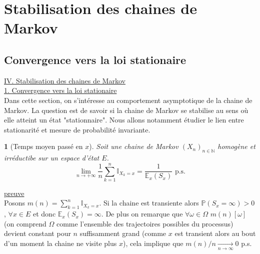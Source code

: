 \documentclass[8pt,notheorems]{beamer}
\def \E{\mathbb E}
\def \N{\mathbb N}
\newtheorem{theorem}{\translate{Theorem}}[section]
\newtheorem{theorem}{\translate{Theoreme}}
\theoremstyle{definition}
\theoremstyle{example}
\theoremstyle{mystyle}
\theoremstyle{plain}
\begin{document}
\section{Stabilisation des chaines de Markov}
\subsection{Convergence vers la loi stationaire}
\begin{frame}[allowframebreaks]
\underline{IV. Stabilisation des chaines de Markov}\\
\underline{1. Convergence vers la loi stationaire}\\
Dans cette section, on s'intéresse au comportement asymptotique de la chaine de Markov. La question est de savoir si la chaine de Markov se stabilise au sens où elle atteint un état "stationnaire". Nous allons notamment étudier le lien entre stationarité et mesure de probabilité invariante.
\begin{theorem}[Temps moyen passé en $x$]\label{prop:LongRunProportion}
Soit une chaine de Markov $(X_n)_{n\in\N}$ homogène et irréductibe sur un espace d'état $E$.
$$
\underset{n\rightarrow+\infty}{\lim} \frac{1}{n}\sum_{k=1}^{n}\mathbb{I}_{X_k=x}=\frac{1}{\E_x(S_x)}\text{ p.s.}
$$

\end{theorem}
\underline{preuve}\\
Posons $m(n)=\sum_{k=1}^{n}\mathbb{I}_{X_k=x}$. Si la chaine est transiente alors $\mathbb{P}(S_x=\infty)>0$, $\forall x\in E$ et donc $\E_x(S_x)=\infty$. De plus on remarque que $\forall\omega\in\Omega$ $m(n)[\omega]$ (on comprend $\Omega$ comme l'ensemble des trajectoires possibles du processus) devient constant pour $n$ suffisamment grand (comme $x$ est transient alors au bout d'un moment la chaine ne visite plus $x$), cela implique que $m(n)/n\underset{n\rightarrow\infty}{\rightarrow} 0$ p.s.\\


\end{frame}
\end{document}
